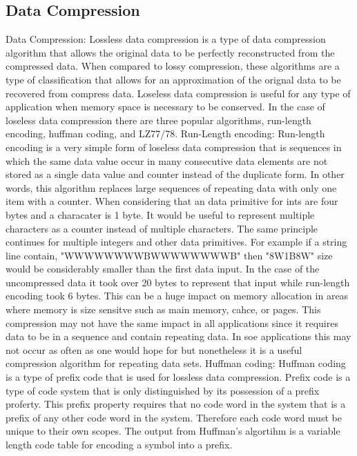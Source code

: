 \documentclass[letterpaper, 12pt]{article}
\begin{document}
\subsection{Data Compression}
Data Compression:
	Lossless data compression is a type of data compression algorithm that allows
	the original data to be perfectly reconstructed from the compressed data. When
	compared to lossy compression, these algorithms are a type of classification that
	allows for an approximation of the orignal data to be recovered from compress data.
	Loseless data compression is useful for any type of application when memory space is
	necessary to be conserved. In the case of loseless data compression there are three 
	popular algorithms, run-length encoding, huffman coding, and LZ77/78. 
Run-Length encoding:
	Run-length encoding is a very simple form of loseless data compression that is sequences
	in which the same data value occur in many consecutive data elements are not stored as a
	single data value and counter instead of the duplicate form. In other words, this algorithm 
	replaces large sequences of repeating data with only one item with a counter. When considering
	that an data primitive for ints are four bytes and a characater is 1 byte. It would be useful
	to represent multiple characters as a counter instead of multiple characters. The same principle
	continues for multiple integers and other data primitives.
	For example if a string line contain, "WWWWWWWWBWWWWWWWWB" then "8W1B8W" size would be considerably
	smaller than the first data input. In the case of the uncompressed data it took over 20 bytes to 
	represent that input while run-length encoding took 6 bytes. This can be a huge impact on memory 
	allocation in areas where memory is size sensitve such as main memory, cahce, or pages.
	This compression may not have the same impact in all applications since it requires data to be 
	in a sequence and contain repeating data. In soe applications this may not occur as often as one would
	hope for but nonetheless it is a useful compression algorithm for repeating data sets.
Huffman coding:
	Huffman coding is a type of prefix code that is used for lossless data compression. Prefix code is a type
	of code system that is only distinguished by its possession of a prefix proferty. This prefix property requires
	that no code word in the system that is a prefix of any other code word in the system. Therefore each code word
	must be unique to their own scopes. The output from Huffman's algortihm is a variable length code table for encoding
	a symbol into a prefix. 
\end{document}
